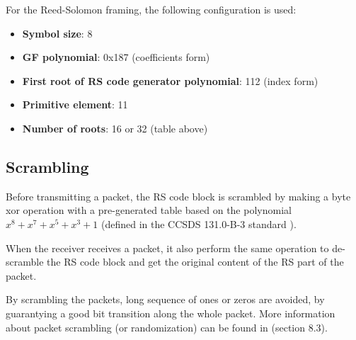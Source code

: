 For the Reed-Solomon framing, the following configuration is used:

\begin{itemize}
    \item \textbf{Symbol size}: 8
    \item \textbf{GF polynomial}: 0x187 (coefficients form)
    \item \textbf{First root of RS code generator polynomial}: 112 (index form)
    \item \textbf{Primitive element}: 11
    \item \textbf{Number of roots}: 16 or 32 (table above)
\end{itemize}

\subsection{Scrambling}

Before transmitting a packet, the RS code block is scrambled by making a byte xor operation with a pre-generated table based on the polynomial $x^{8} + x^{7} + x^{5} + x^{3} + 1$ (defined in the CCSDS 131.0-B-3 standard \cite{ccsds}).

When the receiver receives a packet, it also perform the same operation to de-scramble the RS code block and get the original content of the RS part of the packet.

By scrambling the packets, long sequence of ones or zeros are avoided, by guarantying a good bit transition along the whole packet. More information about packet scrambling (or randomization) can be found in \cite{ccsds} (section 8.3).